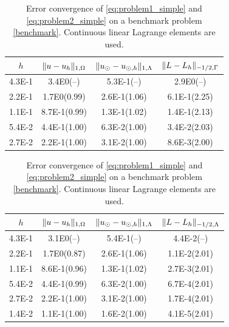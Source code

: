 %
\begin{table}
  \scriptsize{
    \begin{minipage}{0.49\textwidth}
  \begin{center}
    \begin{tabular}{c|ccc}
      \hline
    $h$ & $\lVert{u-u_h}\rVert_{1, \Omega}$ & $\lVert{u_{\odot}-u_{\odot, h}}\rVert_{1, \Lambda}$ & $\lVert{L-L_h}\rVert_{-1/2,\Gamma}$\\
      \hline
4.3E-1 & 3.4E0(--) & 5.3E-1(--) & 2.9E0(--)\\
2.2E-1 & 1.7E0(0.99) & 2.6E-1(1.06) & 6.1E-1(2.25)\\
1.1E-1 & 8.7E-1(0.99) & 1.3E-1(1.02) & 1.4E-1(2.13)\\
5.4E-2 & 4.4E-1(1.00) & 6.3E-2(1.00) & 3.4E-2(2.03)\\
2.7E-2 & 2.2E-1(1.00) & 3.1E-2(1.00) & 8.6E-3(2.00)\\
\hline
  \end{tabular}
  \end{center}
  \end{minipage}
    }
    \vspace{5pt}
  \scriptsize{%
    \begin{minipage}{0.49\textwidth}
      \begin{center}
        \begin{tabular}{c|ccc}
      \hline
    $h$ & $\lVert{u-u_h}\rVert_{1, \Omega}$ & $\lVert{u_{\odot}-u_{\odot, h}}\rVert_{1, \Lambda}$ & $\lVert{L-L_h}\rVert_{-1/2, \Lambda}$\\
      \hline
4.3E-1 & 3.1E0(--)    & 5.4E-1(--)   & 4.4E-2(--)   \\
2.2E-1 & 1.7E0(0.87)  & 2.6E-1(1.06) & 1.1E-2(2.01) \\
1.1E-1 & 8.6E-1(0.96) & 1.3E-1(1.02) & 2.7E-3(2.01) \\
5.4E-2 & 4.4E-1(0.99) & 6.3E-2(1.00) & 6.7E-4(2.01) \\
2.7E-2 & 2.2E-1(1.00) & 3.1E-2(1.00) & 1.7E-4(2.01) \\
1.4E-2 & 1.1E-1(1.00) & 1.6E-2(1.00) & 4.1E-5(2.01) \\
\hline
  \end{tabular}
  \end{center}
  \end{minipage}
  }
  \caption{Error convergence of \eqref{eq:problem1_simple} and \eqref{eq:problem2_simple}
    on a benchmark problem \eqref{benchmark}. Continuous linear Lagrange
    elements are used.
  }
  \label{tab:error_conform}
\end{table}

